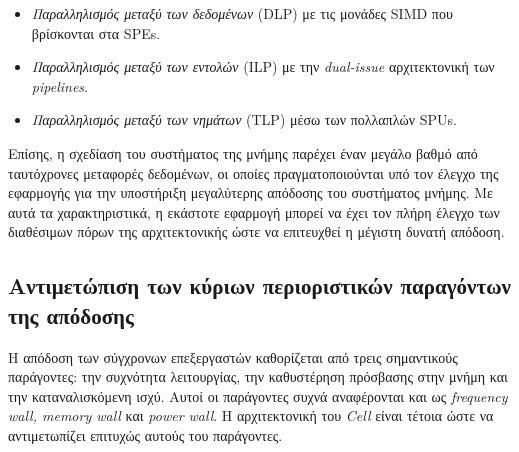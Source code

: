 \begin{itemize}

\item{\textsl{Παραλληλισμός μεταξύ των δεδομένων} (\ac{DLP}) με τις μονάδες \ac{SIMD} που βρίσκονται στα \acp{SPE}.}

\item{\textsl{Παραλληλισμός μεταξύ των εντολών} (\ac{ILP}) με την \textsl{dual-issue} αρχιτεκτονική των \textsl{pipelines}.}

\item{\textsl{Παραλληλισμός μεταξύ των νημάτων} (\ac{TLP}) μέσω των πολλαπλών \acp{SPU}.}

\end{itemize}
\indent
Επίσης, η σχεδίαση του συστήματος της μνήμης παρέχει έναν μεγάλο βαθμό από ταυτόχρονες μεταφορές δεδομένων, οι οποίες πραγματοποιούνται υπό τον έλεγχο της εφαρμογής για την υποστήριξη μεγαλύτερης απόδοσης του συστήματος μνήμης. Με αυτά τα χαρακτηριστικά, η εκάστοτε εφαρμογή μπορεί να έχει τον πλήρη έλεγχο των διαθέσιμων πόρων της αρχιτεκτονικής ώστε να επιτευχθεί η μέγιστη δυνατή απόδοση.

\subsection[3.1.1 Αντιμετώπιση των κύριων περιοριστικών παραγόντων της απόδοσης]{Αντιμετώπιση των κύριων περιοριστικών παραγόντων της απόδοσης}
\label{subsection:sub311}
\indent
Η απόδοση των σύγχρονων επεξεργαστών καθορίζεται από τρεις σημαντικούς παράγοντες: την συχνότητα λειτουργίας, την καθυστέρηση πρόσβασης στην μνήμη και την καταναλισκόμενη ισχύ. Αυτοί οι παράγοντες συχνά αναφέρονται και ως \textsl{frequency wall, memory wall} και \textsl{power wall}. Η αρχιτεκτονική του \textsl{Cell} είναι τέτοια ώστε να αντιμετωπίζει επιτυχώς αυτούς του παράγοντες.\newline \indent

